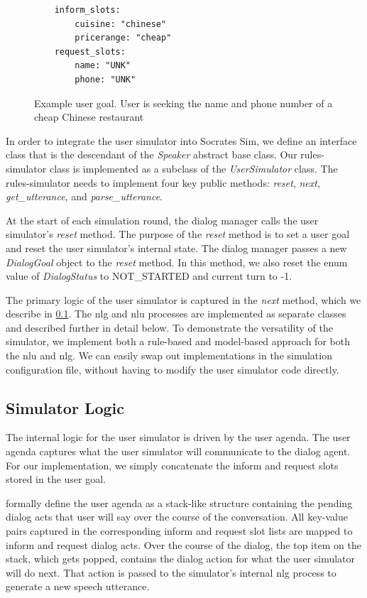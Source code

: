 \begin{figure}[h!]
	\label{fig:ex_user_goal}
	\begin{lstlisting}
	inform_slots:
		cuisine: "chinese"
		pricerange: "cheap"
	request_slots:
		name: "UNK"
		phone: "UNK"		
	\end{lstlisting}
	\caption{ Example user goal. User is seeking the name and phone number of a cheap Chinese restaurant}
	
\end{figure}

\pagebreak

In order to integrate the user simulator into Socrates Sim, we define an interface class that is the descendant of the \textit{Speaker} abstract base class. Our rules-simulator class is implemented as a subclass of the \textit{UserSimulator} class. The rules-simulator needs to implement four key public methods: \textit{reset}, \textit{next}, \textit{get\_utterance}, and \textit{parse\_utterance}. 

At the start of each simulation round, the dialog manager calls the user simulator's \textit{reset} method. The purpose of the \textit{reset} method is to set a user goal and reset the user simulator's internal state. The dialog manager passes a new \textit{DialogGoal} object to the \textit{reset} method. In this method, we also reset the enum value of \textit{DialogStatus} to NOT\_STARTED and current turn to -1.

The primary logic of the user simulator is captured in the \textit{next} method, which we describe in \ref{sssec:logic}. The nlg and nlu processes are implemented as separate classes and described further in detail below. To demonstrate the versatility of the simulator, we implement both a rule-based and model-based approach for both the nlu and nlg. We can easily swap out implementations in the simulation configuration file, without having to modify the user simulator code directly.

\subsection{Simulator Logic}
\label{sssec:logic}

The internal logic for the user simulator is driven by the user agenda. The user agenda captures what the user simulator will communicate to the dialog agent. For our implementation, we simply concatenate the inform and request slots stored in the user goal. 

\cite{Schatzmann2009TheHA} formally define the user agenda as a stack-like structure containing the pending dialog acts that user will say over the course of the conversation. All key-value pairs captured in the corresponding inform and request slot lists are mapped to inform and request dialog acts. Over the course of the dialog, the top item on the stack, which gets popped, contains the dialog action for what the user simulator will do next. That action is passed to the simulator's internal nlg process to generate a new speech utterance. 

